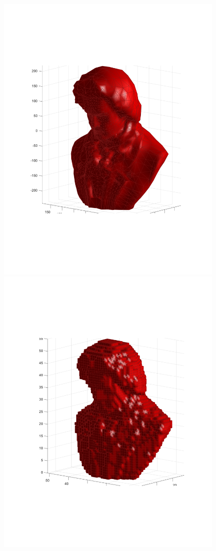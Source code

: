 \documentclass{UCF_ETD}
\begin{document}
\begin{figure}[H] 
\begin{center}
\includegraphics[scale=0.42]{RobustRegistration/Original3DSurfaceData}
\includegraphics[scale=0.42]{RobustRegistration/Voxelized3DSurfaceData}

\end{center}
\end{figure}
\end{document}
